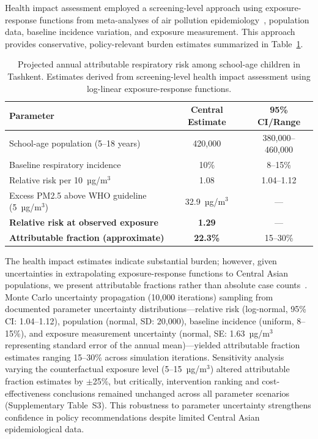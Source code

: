 \documentclass[11pt,a4paper]{article}
\begin{document}
Health impact assessment employed a screening-level approach using exposure-response functions from meta-analyses of air pollution epidemiology~\cite{burnett2014integrated,cohen2017estimates}, population data, baseline incidence variation, and exposure measurement. This approach provides conservative, policy-relevant burden estimates summarized in Table~\ref{tab:health}.

\begin{table}[H]
\centering
\caption{Projected annual attributable respiratory risk among school-age children in Tashkent. Estimates derived from screening-level health impact assessment using log-linear exposure-response functions.}
\label{tab:health}
\begin{tabular}{lcc}
\toprule
Parameter & Central Estimate & 95\% CI/Range \\
\midrule
School-age population (5--18 years) & 420,000 & 380,000--460,000 \\
Baseline respiratory incidence & 10\% & 8--15\% \\
Relative risk per 10~µg/m$^3$ & 1.08 & 1.04--1.12 \\
Excess PM2.5 above WHO guideline (5~µg/m$^3$) & 32.9~µg/m$^3$ & --- \\
\addlinespace
\textbf{Relative risk at observed exposure} & \textbf{1.29} & --- \\
\textbf{Attributable fraction (approximate)} & \textbf{22.3\%} & 15--30\% \\
\bottomrule
\end{tabular}
\end{table}

The health impact estimates indicate substantial burden; however, given uncertainties in extrapolating exposure-response functions to Central Asian populations, we present attributable fractions rather than absolute case counts~\cite{anenberg2019global}. Monte Carlo uncertainty propagation (10,000 iterations) sampling from documented parameter uncertainty distributions---relative risk (log-normal, 95\% CI: 1.04--1.12), population (normal, SD: 20,000), baseline incidence (uniform, 8--15\%), and exposure measurement uncertainty (normal, SE: 1.63~µg/m$^3$ representing standard error of the annual mean)---yielded attributable fraction estimates ranging 15--30\% across simulation iterations. Sensitivity analysis varying the counterfactual exposure level (5--15~µg/m$^3$) altered attributable fraction estimates by $\pm$25\%, but critically, intervention ranking and cost-effectiveness conclusions remained unchanged across all parameter scenarios (Supplementary Table~S3). This robustness to parameter uncertainty strengthens confidence in policy recommendations despite limited Central Asian epidemiological data.
\end{document}
